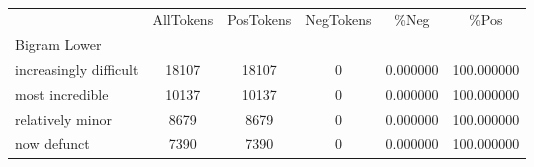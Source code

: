 

\singlespacing
\scriptsize\noindent
\begin{table}
\centering
\caption{}
\label{tab:top-relative-freq-combined}
\begin{tabular}{*{1}{l}S[table-auto-round, table-format=7.2, drop-zero-decimal]
    S[table-auto-round, table-format=7.2, drop-zero-decimal]
    S[table-auto-round, table-format=7.2, drop-zero-decimal]
    S[table-auto-round, table-format=7.2, drop-zero-decimal]
    S[table-auto-round, table-format=7.2, drop-zero-decimal]}
\toprule
{} & {AllTokens} & {PosTokens} & {NegTokens} & {\%Neg} & {\%Pos} \\
{Bigram Lower} & {} & {} & {} & {} & {} \\
\midrule
increasingly difficult & {} \color[HTML]{F1F1F1} 18107 & {} \color[HTML]{F1F1F1} 18107 & {} \color[HTML]{000000} 0 & {} \color[HTML]{000000} 0.000000 & {} \color[HTML]{F1F1F1} 100.000000 \\
most incredible & {} \color[HTML]{F1F1F1} 10137 & {} \color[HTML]{F1F1F1} 10137 & {} \color[HTML]{000000} 0 & {} \color[HTML]{000000} 0.000000 & {} \color[HTML]{F1F1F1} 100.000000 \\
relatively minor & {} \color[HTML]{000000} 8679 & {} \color[HTML]{F1F1F1} 8679 & {} \color[HTML]{000000} 0 & {} \color[HTML]{000000} 0.000000 & {} \color[HTML]{F1F1F1} 100.000000 \\
now defunct & {} \color[HTML]{000000} 7390 & {} \color[HTML]{000000} 7390 & {} \color[HTML]{000000} 0 & {} \color[HTML]{000000} 0.000000 & {} \color[HTML]{F1F1F1} 100.000000 \\

\end{tabular}
\end{table}
